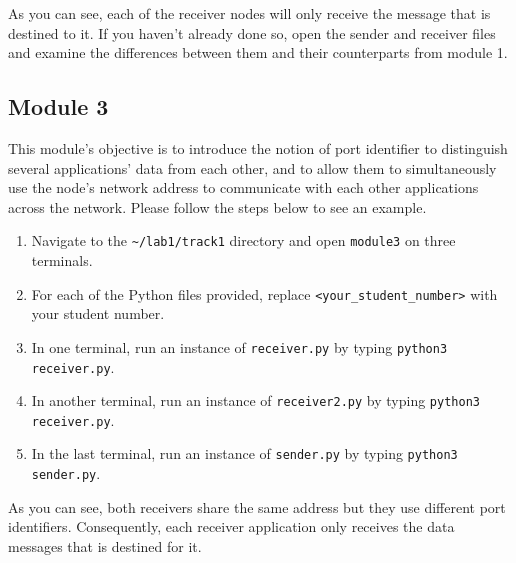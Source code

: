 \documentclass[11pt]{article}
\begin{document}

As you can see, each of the receiver nodes will only receive the message that is destined to it.
If you haven't already done so, open the sender and receiver files and examine the differences between them and their counterparts from module 1.



\subsection{Module 3}
\label{subsec:module3}
This module's objective is to introduce the notion of port identifier to distinguish several applications' data from each other, and to allow them to simultaneously use the node's network address to communicate with each other applications across the network. Please follow the steps below to see an example.


\begin{enumerate}
    \item Navigate to the \texttt{\textasciitilde/lab1/track1} directory and open \texttt{module3} on three terminals.
    \item For each of the Python files provided, replace \texttt{<your\_student\_number>} with your student number.
    \item In one terminal, run an instance of \texttt{receiver.py} by typing \texttt{python3 receiver.py}.
    \item In another terminal, run an instance of \texttt{receiver2.py} by typing \texttt{python3 receiver.py}.
    \item In the last terminal, run an instance of \texttt{sender.py} by typing \texttt{python3 sender.py}.
\end{enumerate}

As you can see, both receivers share the same address but they use different port identifiers.
Consequently, each receiver application only receives the data messages that is destined for it.
\end{document}
